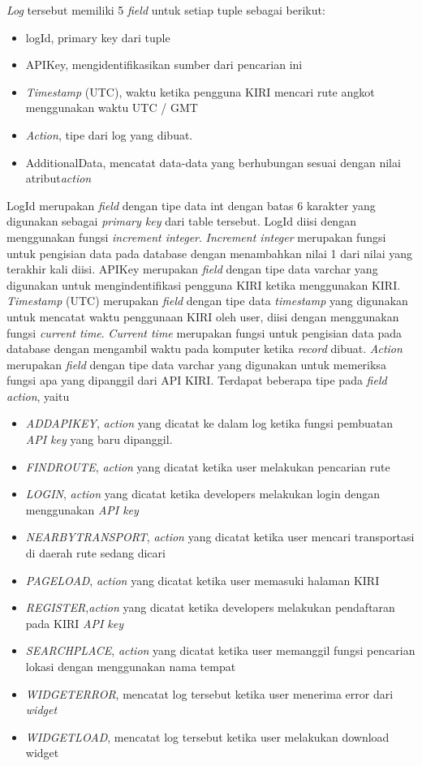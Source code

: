\textsl{Log} tersebut memiliki 5 \textsl{field} untuk setiap tuple sebagai berikut:
\begin{itemize}
	\item logId, primary key dari tuple
	\item APIKey, mengidentifikasikan sumber dari pencarian ini
	\item \textsl{Timestamp} (UTC), waktu ketika pengguna KIRI mencari rute angkot menggunakan waktu UTC / GMT
	\item \textsl{Action}, tipe dari log yang dibuat.
	\item AdditionalData, mencatat data-data yang berhubungan sesuai dengan nilai atribut\textsl{action}
\end{itemize}

LogId merupakan \textsl{field} dengan tipe data int dengan batas 6 karakter yang digunakan sebagai \textsl{primary key} dari table tersebut. LogId diisi dengan menggunakan fungsi \textsl{increment integer}. \textsl{Increment integer} merupakan fungsi untuk pengisian data pada database dengan menambahkan nilai 1 dari nilai yang terakhir kali diisi.
APIKey merupakan \textsl{field} dengan tipe data varchar yang digunakan untuk mengindentifikasi pengguna KIRI ketika menggunakan KIRI.
\textsl{Timestamp} (UTC) merupakan \textsl{field} dengan tipe data \textsl{timestamp} yang digunakan untuk mencatat waktu penggunaan KIRI oleh user, diisi dengan menggunakan fungsi \textsl{current time}. \textsl{Current time} merupakan fungsi untuk pengisian data pada database dengan mengambil waktu pada komputer ketika \textsl{record} dibuat.
\textsl{Action} merupakan \textsl{field} dengan tipe data varchar yang digunakan untuk memeriksa fungsi apa yang dipanggil dari API KIRI. Terdapat beberapa tipe pada \textsl{field action}, yaitu
\begin{itemize}
	\item \textsl{ADDAPIKEY}, \textsl{action} yang dicatat ke dalam log ketika fungsi pembuatan \textsl{API key} yang baru dipanggil.
	\item \textsl{FINDROUTE}, \textsl{action} yang dicatat ketika user melakukan pencarian rute
	\item \textsl{LOGIN}, \textsl{action} yang dicatat ketika developers melakukan login dengan menggunakan \textsl{API key}
	\item \textsl{NEARBYTRANSPORT}, \textsl{action} yang dicatat ketika user mencari transportasi di daerah rute sedang dicari
	\item \textsl{PAGELOAD}, \textsl{action} yang dicatat ketika user memasuki halaman KIRI
 	\item \textsl{REGISTER},\textsl{action} yang dicatat ketika developers melakukan pendaftaran pada KIRI \textsl{API key}
	\item \textsl{SEARCHPLACE}, \textsl{action} yang dicatat ketika user memanggil fungsi pencarian lokasi dengan menggunakan nama tempat
	\item \textsl{WIDGETERROR}, mencatat log tersebut ketika user menerima error dari \textit{widget}
	\item \textsl{WIDGETLOAD}, mencatat log tersebut ketika user melakukan download widget
\end{itemize}
